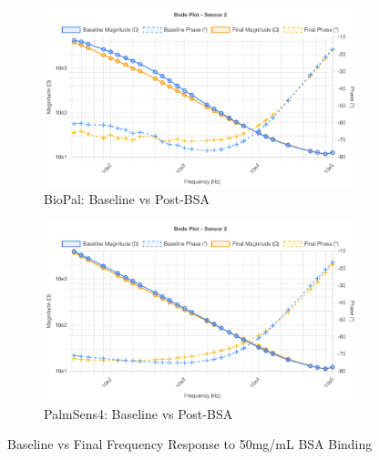 \begin{figure}[H]
    \centering
    \begin{subfigure}{0.48\textwidth}   
        \includegraphics[width=\textwidth]{5g-100mL BioPal.png}
        \caption{BioPal: Baseline vs Post-BSA}
        \label{fig:5g_biopal}
    \end{subfigure}
    \hfill
    \begin{subfigure}{0.48\textwidth}
        \includegraphics[width=\textwidth]{PalmSens5g.png}
        \caption{PalmSens4: Baseline vs Post-BSA}
        \label{fig:5g_palmsens}
    \end{subfigure}
    \caption{Baseline vs Final Frequency Response to 50mg/mL BSA Binding}
    \label{fig:5g_bsa_comparison_final}
\end{figure}

